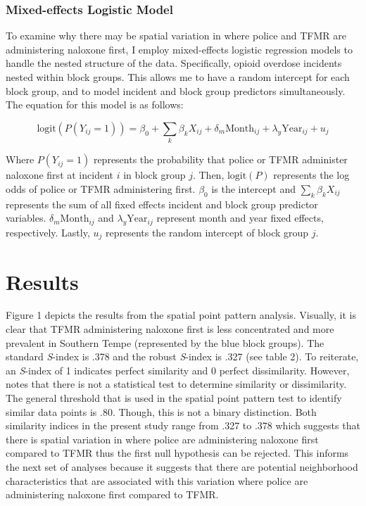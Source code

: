 \subsubsection{Mixed-effects Logistic Model}
To examine why there may be spatial variation in where police and TFMR are administering naloxone first, I employ mixed-effects logistic regression models to handle the nested structure of the data. Specifically, opioid overdose incidents nested within block groups. This allows me to have a random intercept for each block group, and to model incident and block group predictors simultaneously. The equation for this model is as follows:

\[
\text{logit}\left(P(Y_{ij} = 1)\right) = \beta_0 + \sum_{k} \beta_k X_{ij} + \delta_m \text{Month}_{ij} + \lambda_y \text{Year}_{ij} + u_j
\]

\noindent Where \(P(Y_{ij} = 1)\) represents the probability that police or TFMR administer naloxone first at incident \(i\) in block group \(j\). Then, \(\text{logit}(P)\) represents the log odds of police or TFMR administering first. \(\beta_0\) is the intercept and \(\sum_{k} \beta_k X_{ij}\) represents the sum of all fixed effects incident and block group predictor variables. \(\delta_m \text{Month}_{ij}\) and \(\lambda_y \text{Year}_{ij}\) represent month and year fixed effects, respectively. Lastly, \(u_j\) represents the random intercept of block group \(j\).

\section{Results}

Figure 1 depicts the results from the spatial point pattern analysis. Visually, it is clear that TFMR administering naloxone first is less concentrated and more prevalent in Southern Tempe (represented by the blue block groups). The standard \textit{S}-index is .378 and the robust \textit{S}-index is .327 (see table 2). To reiterate, an \textit{S}-index of 1 indicates perfect similarity and 0 perfect dissimilarity. However, \textcite{andresen_area-based_2016} notes that there is not a statistical test to determine similarity or dissimilarity. The general threshold that is used in the spatial point pattern test to identify similar data points is .80. Though, this is not a binary distinction. Both similarity indices in the present study range from .327 to .378 which suggests that there is spatial variation in where police are administering naloxone first compared to TFMR thus the first null hypothesis can be rejected. This informs the next set of analyses because it suggests that there are potential neighborhood characteristics that are associated with this variation where police are administering naloxone first compared to TFMR.

